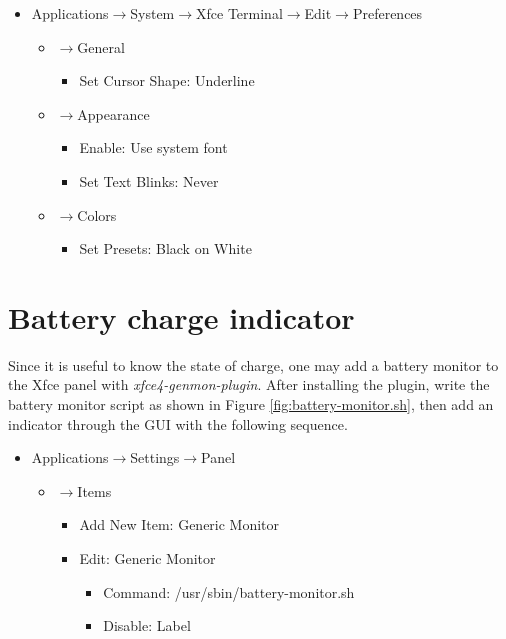 \documentclass{memoir}
\begin{document}
\begin{itemize}
\item[]{Applications$\rightarrow$System$\rightarrow$Xfce Terminal$\rightarrow$Edit$\rightarrow$Preferences}
  \begin{itemize}
  \item[]{$\rightarrow$General}
    \begin{itemize}
      \item[]{Set Cursor Shape: Underline}
    \end{itemize}
  \item[]{$\rightarrow$Appearance}
    \begin{itemize}
      \item[]{Enable: Use system font}
      \item[]{Set Text Blinks: Never}
    \end{itemize}
  \item[]{$\rightarrow$Colors}
    \begin{itemize}
      \item[]{Set Presets: Black on White}
    \end{itemize}
  \end{itemize}
\end{itemize}





\pagebreak
\section{Battery charge indicator}
Since it is useful to know the state of charge, one may add a battery monitor to the Xfce panel with \textit{xfce4-genmon-plugin}. After installing the plugin, write the battery monitor script as shown in Figure \ref{fig:battery-monitor.sh}, then add an indicator through the GUI with the following sequence.

\begin{itemize}
\item[]{Applications$\rightarrow$Settings$\rightarrow$Panel}
  \begin{itemize}
  \item[]{$\rightarrow$Items}
    \begin{itemize}
    \item[]{Add New Item: Generic Monitor}
      \item[]{Edit: Generic Monitor}
        \begin{itemize}
          \item[]{Command: /usr/sbin/battery-monitor.sh}
          \item[]{Disable: Label}
        \end{itemize}
    \end{itemize}
  \end{itemize}
\end{itemize}
\end{document}
